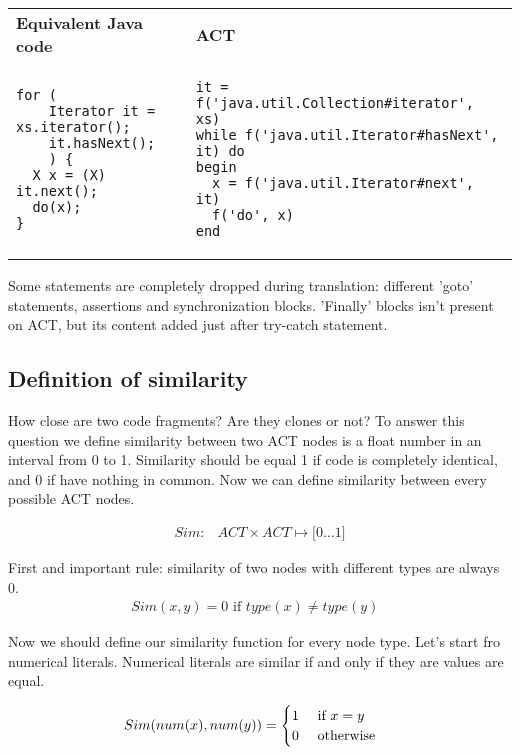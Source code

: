 \begin{tabular}{ p{6cm} p{6cm} }
\textbf{Equivalent Java code} & \textbf{ACT} \\
\begin{verbatim}
for (
    Iterator it = xs.iterator();
    it.hasNext();
    ) {
  X x = (X) it.next();
  do(x);    
}
\end{verbatim} 
  & 
\begin{verbatim}
it = f('java.util.Collection#iterator', xs)
while f('java.util.Iterator#hasNext', it) do 
begin
  x = f('java.util.Iterator#next', it)
  f('do', x)
end
\end{verbatim}
\end{tabular}

Some statements are completely dropped during translation: different 'goto' statements, assertions and synchronization
blocks. 'Finally' blocks isn't  present on ACT, but its content added just after try-catch statement.

\subsection{Definition of similarity}

How close are two code fragments?
Are they clones or not?
To answer this question we define similarity between two ACT nodes is a float number in an interval from 0 to 1.
Similarity should be equal 1 if code is completely identical, and 0 if have nothing in common.
Now we can define similarity between every possible ACT nodes.

\begin{align*}
  Sim \colon & ACT \times ACT \mapsto \lbrack 0 \ldots 1 \rbrack
\end{align*}

First and important rule: similarity of two nodes with different types are always 0.
\begin{align*}
  Sim(x, y) = 0 \text{ if $type(x) \neq type(y)$ }
\end{align*}

Now we should define our similarity function for every node type. Let's start fro numerical literals. Numerical literals are similar if and only if they are values are equal.

\begin{align*}
Sim(num(x), num(y)) &= 
	\begin{cases} 
		\hfill 1  \hfill & \text{ if $x = y$} \\
		\hfill 0	\hfill & \text{ otherwise } \\
	\end{cases}
\end{align*}


